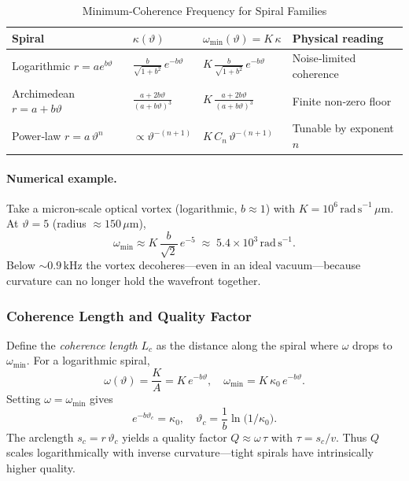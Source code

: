 \begin{table}[H]
  \small
  \centering
  \caption{Minimum‐Coherence Frequency for Spiral Families}
  \label{tab:coherence-frequencies}
  \begin{tabular}{@{}p{} p{} p{} p{}@{}}
    \toprule
    \textbf{Spiral} & \(\kappa(\vartheta)\) & \(\omega_{\min}(\vartheta)=K\,\kappa\) & \textbf{Physical reading} \\
    \midrule
    Logarithmic \(r=a e^{b\vartheta}\) 
      & \(\tfrac{b}{\sqrt{1+b^{2}}}\,e^{-b\vartheta}\) 
      & \(K\,\tfrac{b}{\sqrt{1+b^{2}}}\,e^{-b\vartheta}\) 
      & Noise‐limited coherence \\
    Archimedean \(r=a+b\vartheta\) 
      & \(\tfrac{a+2b\vartheta}{(a+b\vartheta)^{3}}\) 
      & \(K\,\tfrac{a+2b\vartheta}{(a+b\vartheta)^{3}}\) 
      & Finite non‐zero floor \\
    Power‐law \(r=a\,\vartheta^{n}\) 
      & \(\propto \vartheta^{-(n+1)}\) 
      & \(K\,C_{n}\,\vartheta^{-(n+1)}\) 
      & Tunable by exponent \(n\) \\
    \bottomrule
  \end{tabular}
\end{table}

\medskip

\paragraph{Numerical example.}  
Take a micron‐scale optical vortex (logarithmic, \(b\approx1\)) with 
\(K=10^{6}\,\mathrm{rad\,s}^{-1}\,\mu\mathrm{m}\).  At \(\vartheta=5\) (radius \(\approx150\,\mu\mathrm{m}\)),
\[
  \omega_{\min}\approx K\,\frac{b}{\sqrt{2}}\,e^{-5}
  \;\approx\;5.4\times10^{3}\,\mathrm{rad\,s}^{-1}.
\]
Below \(\sim0.9\,\mathrm{kHz}\) the vortex decoheres—even in an ideal vacuum—because curvature can no longer hold the wavefront together.

\medskip
\subsubsection{Coherence Length and Quality Factor}

Define the \emph{coherence length} \(L_c\) as the distance along the spiral where \(\omega\) drops to \(\omega_{\min}\).  For a logarithmic spiral,
\[
  \omega(\vartheta)=\frac{K}{A}=K\,e^{-b\vartheta},
  \quad
  \omega_{\min}=K\,\kappa_{0}\,e^{-b\vartheta}.
\]
Setting \(\omega=\omega_{\min}\) gives
\[
  e^{-b\vartheta_c}=\kappa_{0},
  \quad
  \vartheta_c=\frac{1}{b}\ln\!\bigl(1/\kappa_{0}\bigr).
\]
The arclength \(s_c=r\,\vartheta_c\) yields a quality factor \(Q\approx\omega\,\tau\) with \(\tau=s_c/v\).  Thus \(Q\) scales logarithmically with inverse curvature—tight spirals have intrinsically higher quality.

